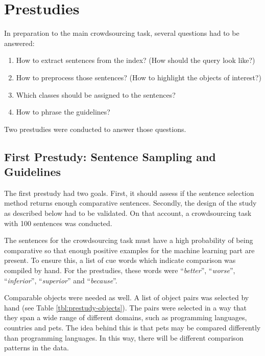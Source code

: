 \section{Prestudies}
In preparation to the main crowdsourcing task, several questions had to be answered:
\begin{enumerate}
\item How to extract sentences from the index? (How should the query look like?)
\item How to preprocess those sentences? (How to highlight the objects of interest?)
\item Which classes should be assigned to the sentences?
\item How to phrase the guidelines?
\end{enumerate}

Two prestudies were conducted to answer those questions.

\subsection{First Prestudy: Sentence Sampling and Guidelines }
The first prestudy had two goals. First, it should assess if the sentence selection method returns enough comparative sentences. Secondly, the design of the study as described below had to be validated. On that account, a crowdsourcing task with 100 sentences was conducted. 

The sentences for the crowdsourcing task must have a high probability of being comparative so that enough positive examples for the machine learning part are present. To ensure this, a list of cue words which indicate comparison was compiled by hand. For the prestudies, these words were \enquote{\emph{better}}, \enquote{\emph{worse}}, \enquote{\emph{inferior}}, \enquote{\emph{superior}} and \enquote{\emph{because}}. 

Comparable objects were needed as well. A list of object pairs was selected by hand (see Table \ref{tbl:prestudy-objects}). The pairs were selected in a way that they span a wide range of different domains, such as programming languages, countries and pets. The idea behind this is that pets may be compared differently than programming languages. In this way, there will be different comparison patterns in the data.


